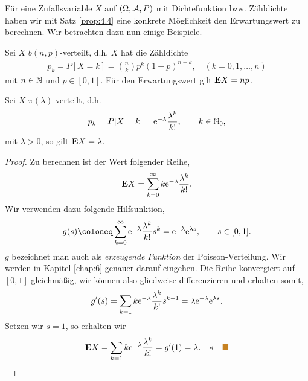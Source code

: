 Für eine Zufallsvariable $X$ auf $(\Omega,\AA,P)$ mit Dichtefunktion bzw.
Zähldichte haben wir mit Satz \ref{prop:4.4} eine konkrete Möglichkeit den
Erwartungswert zu berechnen. Wir betrachten dazu nun einige Beispiele.
\begin{bsp}
Sei $X$ $b(n,p)$-verteilt, d.h. $X$ hat die Zähldichte
\begin{align*}
p_k = P[X=k]= {n \choose k}p^{k}(1-p)^{n-k},\quad (k=0,1, \ldots,n)
\end{align*}
mit $n \in \N$ und $p\in [0,1]$. Für den Erwartungswert gilt $\E X=np$.\bsphere
\end{bsp}
\begin{bsp}
Sei $X$ $\pi(\lambda )$-verteilt, d.h.
\begin{align*}
p_k=P[X=k]=\e^{- \lambda}{\displaystyle
\frac{\lambda^{k}}{k!}},\qquad  k \in \N_{0},
\end{align*}
mit $\lambda >0$, so gilt $\E X = \lambda $.
\begin{proof}
Zu berechnen ist der Wert folgender Reihe,
\begin{align*}
\E X = \sum_{k=0}^\infty k\e^{-\lambda}\frac{\lambda^k}{k!}.
\end{align*}
Wir verwenden dazu folgende Hilfsunktion,
\begin{align*}
g(s) \defl \sum\limits_{k=0}^{\infty} \e^{-\lambda}\frac{\lambda^k}{k!}s^k
= \e^{-\lambda}\e^{\lambda s},\qquad s\in [0,1].
\end{align*}
$g$ bezeichnet man auch als \emph{erzeugende Funktion} der Poisson-Verteilung.
Wir werden in Kapitel \ref{chap:6} genauer darauf eingehen. Die Reihe
konvergiert auf $[0,1]$ gleichmäßig, wir können also gliedweise
differenzieren und erhalten somit,
\begin{align*}
g'(s) = \sum\limits_{k=1}k \e^{-\lambda} \frac{\lambda^k}{k!}s^{k-1}
= \lambda \e^{-\lambda} \e^{\lambda s}.
\end{align*}
Setzen wir $s=1$, so erhalten wir
\begin{align*}
\E X = \sum\limits_{k=1}k \e^{-\lambda} \frac{\lambda^k}{k!} = g'(1)
= \lambda.\qedhere\bsphere
\end{align*}
\end{proof}
\end{bsp}
